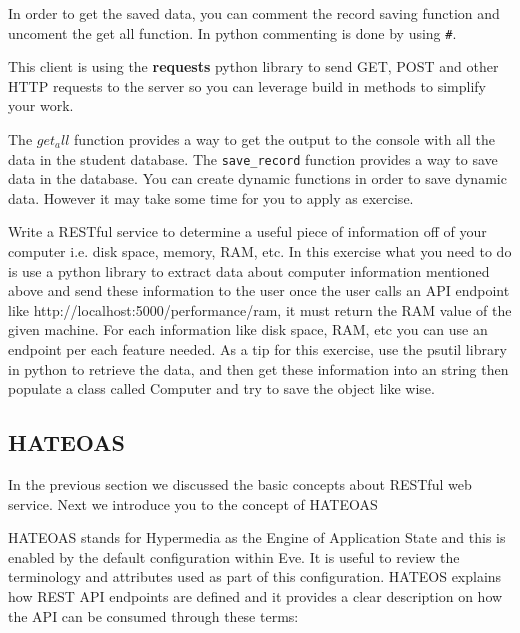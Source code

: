 In order to get the saved data, you can comment the record saving function and
uncoment the get all function. In python commenting is done by using \verb|#|.

This client is using the \textbf{requests} python
library to send GET, POST and other HTTP requests to the server so you
can leverage build in methods to simplify your work.

The $get_all$ function provides a way to get the output to the
console with all the data in the student database. The \verb|save_record|
function provides a way to save data in the database. You can create
dynamic functions in order to save dynamic data. However it may take
some time for you to apply as exercise.

\begin{exercise}
Write a RESTful service to determine a useful piece of information off
of your computer i.e. disk space, memory, RAM, etc. In this exercise what
you need to do is use a python library to extract data about computer
information mentioned above and send these information to the user once
the user calls an API endpoint like http://localhost:5000/performance/ram,
it must return the RAM value of the given machine. For each information like
disk space, RAM, etc you can use an endpoint per each feature needed. As a tip 
for this exercise, use the psutil library in python to retrieve the data, and
then get these information into an string then populate a class called Computer 
and try to save the object like wise.
\end{exercise}

\subsection{HATEOAS}\label{s:hateoas}

In the previous section we discussed the basic concepts about RESTful
web service. Next we introduce you to the concept of HATEOAS

HATEOAS stands for Hypermedia as the Engine of Application State and
this is enabled by the default configuration within Eve. It is useful
to review the terminology and attributes used as part of this
configuration. HATEOS explains how REST API endpoints are defined and it
provides a clear description on how the API can be consumed through
these terms:

